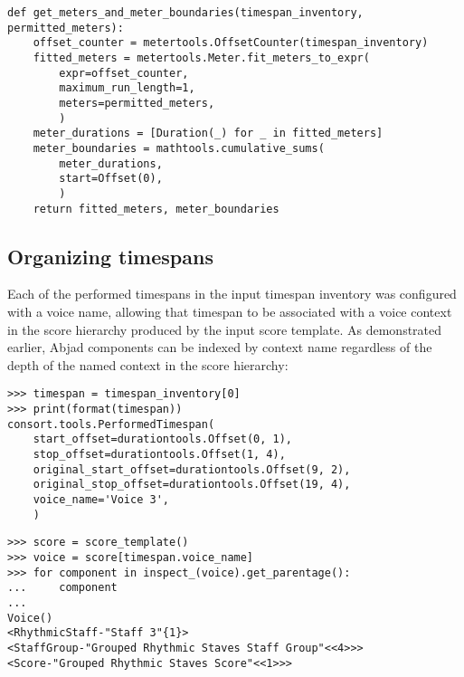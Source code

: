 \begin{comment}
<abjadextract dissertation.py.time_tools:get_meters_and_meter_boundaries />[strip_prompt]
\end{comment}

\begin{singlespacing}
\vspace{-0.5\baselineskip}
\begin{lstlisting}
def get_meters_and_meter_boundaries(timespan_inventory, permitted_meters):
    offset_counter = metertools.OffsetCounter(timespan_inventory)
    fitted_meters = metertools.Meter.fit_meters_to_expr(
        expr=offset_counter,
        maximum_run_length=1,
        meters=permitted_meters,
        )
    meter_durations = [Duration(_) for _ in fitted_meters]
    meter_boundaries = mathtools.cumulative_sums(
        meter_durations,
        start=Offset(0),
        )
    return fitted_meters, meter_boundaries
\end{lstlisting}
\end{singlespacing}

\subsection{Organizing timespans}

Each of the performed timespans in the input timespan inventory was configured
with a voice name, allowing that timespan to be associated with a voice context
in the score hierarchy produced by the input score template. As demonstrated
earlier, Abjad components can be indexed by context name regardless of the
depth of the named context in the score hierarchy:

\begin{comment}
<abjad>
timespan = timespan_inventory[0]
print(format(timespan))
score = score_template()
voice = score[timespan.voice_name]
for component in inspect_(voice).get_parentage():
    component

</abjad>
\end{comment}

\begin{singlespacing}
\vspace{-0.5\baselineskip}
\begin{lstlisting}
>>> timespan = timespan_inventory[0]
>>> print(format(timespan))
consort.tools.PerformedTimespan(
    start_offset=durationtools.Offset(0, 1),
    stop_offset=durationtools.Offset(1, 4),
    original_start_offset=durationtools.Offset(9, 2),
    original_stop_offset=durationtools.Offset(19, 4),
    voice_name='Voice 3',
    )
\end{lstlisting}
\begin{lstlisting}
>>> score = score_template()
>>> voice = score[timespan.voice_name]
>>> for component in inspect_(voice).get_parentage():
...     component
...
Voice()
<RhythmicStaff-"Staff 3"{1}>
<StaffGroup-"Grouped Rhythmic Staves Staff Group"<<4>>>
<Score-"Grouped Rhythmic Staves Score"<<1>>>
\end{lstlisting}
\end{singlespacing}

